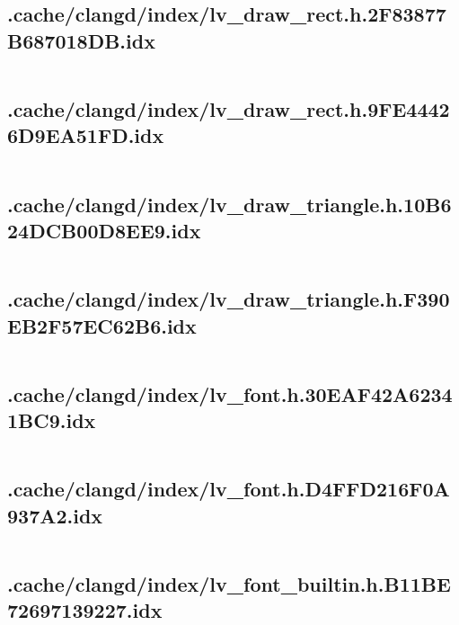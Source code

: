 \subsection{.cache/clangd/index/lv_draw_rect.h.2F83877B687018DB.idx}
\inputminted[linenos,tabsize=2,breaklines, breakanywhere]{c}{lv_draw_rect.h.2F83877B687018DB.idx}
\pagebreak

\subsection{.cache/clangd/index/lv_draw_rect.h.9FE44426D9EA51FD.idx}
\inputminted[linenos,tabsize=2,breaklines, breakanywhere]{c}{lv_draw_rect.h.9FE44426D9EA51FD.idx}
\pagebreak

\subsection{.cache/clangd/index/lv_draw_triangle.h.10B624DCB00D8EE9.idx}
\inputminted[linenos,tabsize=2,breaklines, breakanywhere]{c}{lv_draw_triangle.h.10B624DCB00D8EE9.idx}
\pagebreak

\subsection{.cache/clangd/index/lv_draw_triangle.h.F390EB2F57EC62B6.idx}
\inputminted[linenos,tabsize=2,breaklines, breakanywhere]{c}{lv_draw_triangle.h.F390EB2F57EC62B6.idx}
\pagebreak

\subsection{.cache/clangd/index/lv_font.h.30EAF42A62341BC9.idx}
\inputminted[linenos,tabsize=2,breaklines, breakanywhere]{c}{lv_font.h.30EAF42A62341BC9.idx}
\pagebreak

\subsection{.cache/clangd/index/lv_font.h.D4FFD216F0A937A2.idx}
\inputminted[linenos,tabsize=2,breaklines, breakanywhere]{c}{lv_font.h.D4FFD216F0A937A2.idx}
\pagebreak

\subsection{.cache/clangd/index/lv_font_builtin.h.B11BE72697139227.idx}
\inputminted[linenos,tabsize=2,breaklines, breakanywhere]{c}{lv_font_builtin.h.B11BE72697139227.idx}
\pagebreak

